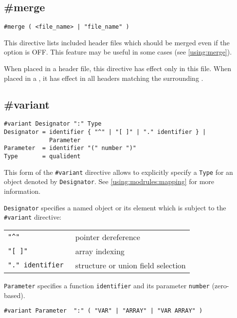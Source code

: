 \subsection{\#merge}
\label{rules:nonstandard:merge}

\begin{verbatim}
#merge ( <file_name> | "file_name" )
\end{verbatim}

This directive lists included header files which should be merged even
if the  option is OFF. This feature may be
useful in some cases (see \ref{using:merge}).

When placed in a header file, this directive has effect only in this file.
When placed in a \ProjectFile{}, it has effect in all headers matching
the surrounding .

\subsection{\#variant}
\label{rules:nonstandard:variant}

\begin{verbatim}
#variant Designator ":" Type
Designator = identifier { "^" | "[ ]" | "." identifier } |
             Parameter
Parameter  = identifier "(" number ")"
Type       = qualident
\end{verbatim}

This form of the \verb'#variant' directive allows to explicitly
specify a \mt{} \verb'Type' for an object denoted by \verb'Designator'.
See \ref{using:modrules:mapping} for more information.

{\tt Designator} specifies a named object or its element
which is subject to the \verb'#variant' directive:

\begin{flushleft}
\begin{tabular}{ll}
\tt "\^{}"         & pointer dereference \\
\tt "[ ]"          & array indexing \\
\tt "." identifier & structure or union field selection
\end{tabular}
\end{flushleft}

{\tt Parameter} specifies a function \verb'identifier' and its
parameter \verb'number' (zero-based).


\begin{verbatim}
#variant Parameter  ":" ( "VAR" | "ARRAY" | "VAR ARRAY" )
\end{verbatim}

